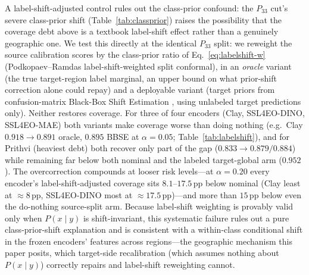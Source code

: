 \documentclass[preprint,11pt,authoryear]{elsarticle}
\begin{document}
A label-shift-adjusted control rules out the class-prior confound: the $P_{33}$ cut's
severe class-prior shift (Table~\ref{tab:classprior}) raises the possibility that the
coverage debt above is a textbook label-shift effect \citep{podkopaev2021labelshift} rather than a
genuinely geographic one. We test this directly at the identical $P_{33}$ split: we reweight the
source calibration scores by the class-prior ratio of Eq.~\eqref{eq:labelshift-w}
(Podkopaev--Ramdas label-shift-weighted split conformal), in an \emph{oracle} variant (the true
target-region label marginal, an upper bound on what prior-shift correction alone could repay) and a
deployable variant (target priors from confusion-matrix Black-Box Shift Estimation
\citep{lipton2018bbse}, using unlabeled target predictions only). Neither restores
coverage. For three of four encoders (Clay, SSL4EO-DINO, SSL4EO-MAE) both variants make coverage
worse than doing nothing (e.g.\ Clay $0.918\to0.891$ oracle, $0.895$ BBSE at $\alpha=0.05$;
Table~\ref{tab:labelshift}), and for Prithvi (heaviest debt) both recover only part of the gap
($0.833\to0.879/0.884$) while remaining far below both nominal and the labeled target-global arm
($0.952$). The overcorrection compounds at looser risk levels---at $\alpha=0.20$ every encoder's
label-shift-adjusted coverage sits $8.1$--$17.5$\,pp below nominal (Clay least at ${\approx}8$\,pp,
SSL4EO-DINO most at ${\approx}17.5$\,pp)---and more than $15$\,pp below even the do-nothing source-split
arm. Because label-shift weighting is
provably valid only when $P(x\mid y)$ is shift-invariant, this systematic failure rules out a pure
class-prior-shift explanation and is consistent with a within-class conditional shift in the frozen
encoders' features across regions---the geographic mechanism this paper posits, which target-side
recalibration (which assumes nothing about $P(x\mid y)$) correctly repairs and label-shift reweighting
cannot.
\end{document}
